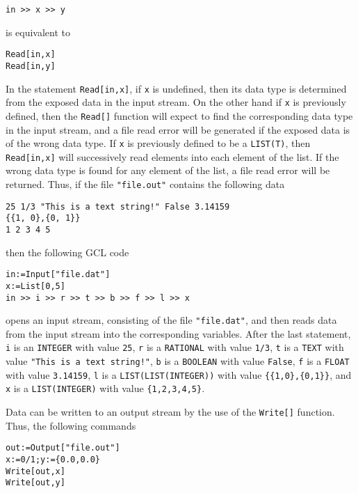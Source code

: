\begin{verbatim}
in >> x >> y
\end{verbatim}
 
\noindent
is equivalent to 

\begin{verbatim}
Read[in,x]
Read[in,y]
\end{verbatim}

\noindent
In the statement \verb+Read[in,x]+, if \verb+x+ is undefined, then its
data type is determined from the exposed data in the input stream.  On
the other hand if \verb+x+ is previously defined, then the \verb+Read[]+
function will expect to find the corresponding data type in the input
stream, and a file read error will be generated if the exposed data is
of the wrong data type.  If \verb+x+ is previously defined to be a
\verb+LIST(T)+, then \verb+Read[in,x]+ will successively read elements into
each element of the list.  If the wrong data type is found for any
element of the list, a file read error will be returned.  Thus, if the
file \verb+"file.out"+ contains the following data

\begin{verbatim}
25 1/3 "This is a text string!" False 3.14159 
{{1, 0},{0, 1}}
1 2 3 4 5
\end{verbatim}

\noindent
then the following GCL code

\begin{verbatim}
in:=Input["file.dat"]
x:=List[0,5]
in >> i >> r >> t >> b >> f >> l >> x
\end{verbatim}

\noindent
opens an input stream, consisting of the file \verb+"file.dat"+, and
then reads data from the input stream into the corresponding
variables.  After the last statement, 
\verb+i+ is an \verb+INTEGER+ with value \verb+25+, 
\verb+r+ is a \verb+RATIONAL+ with value \verb+1/3+, 
\verb+t+ is a \verb+TEXT+ with value \verb+"This is a text string!"+, 
\verb+b+ is a \verb+BOOLEAN+ with value \verb+False+, 
\verb+f+ is a \verb+FLOAT+ with value \verb+3.14159+, 
\verb+l+ is a \verb+LIST(LIST(INTEGER))+ with value \verb+{{1,0},{0,1}}+, and 
\verb+x+ is a \verb+LIST(INTEGER)+ with value \verb+{1,2,3,4,5}+.  

Data can be written to an output stream by the use of the \verb+Write[]+
function.  Thus, the following commands

\begin{verbatim}
out:=Output["file.out"]
x:=0/1;y:={0.0,0.0}
Write[out,x]
Write[out,y]
\end{verbatim}

